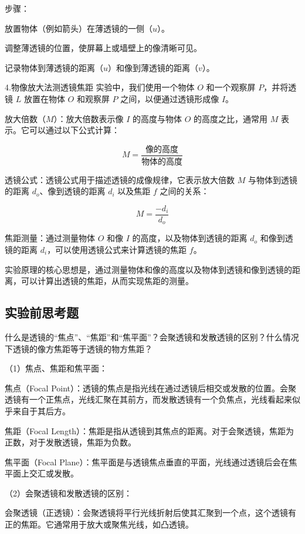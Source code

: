 \documentclass[dvipsnames, svgnames,a4paper,11pt]{article}
\begin{document}
	步骤：
	
	放置物体（例如箭头）在薄透镜的一侧（\(u\)）。
	
	调整薄透镜的位置，使屏幕上或墙壁上的像清晰可见。
	
	记录物体到薄透镜的距离（\(u\)）和像到薄透镜的距离（\(v\)）。
	
	4.物像放大法测透镜焦距
	实验中，我们使用一个物体 \(O\) 和一个观察屏 \(P\)，并将透镜 \(L\) 放置在物体 \(O\) 和观察屏 \(P\) 之间，以便通过透镜形成像 \(I\)。
	
	放大倍数（\(M\)）：放大倍数表示像 \(I\) 的高度与物体 \(O\) 的高度之比，通常用 \(M\) 表示。它可以通过以下公式计算：
	
	\[
	M = \frac{{\text{像的高度}}}{{\text{物体的高度}}}
	\]
	
	透镜公式：透镜公式用于描述透镜的成像规律，它表示放大倍数 \(M\) 与物体到透镜的距离 \(d_o\)、像到透镜的距离 \(d_i\) 以及焦距 \(f\) 之间的关系：
	
	\[
	M = \frac{{-d_i}}{{d_o}}
	\]
	
	焦距测量：通过测量物体 \(O\) 和像 \(I\) 的高度，以及物体到透镜的距离 \(d_o\) 和像到透镜的距离 \(d_i\)，可以使用透镜公式来计算透镜的焦距 \(f\)。
	
	实验原理的核心思想是，通过测量物体和像的高度以及物体到透镜和像到透镜的距离，可以计算出透镜的焦距，从而实现焦距的测量。
	
	\subsection{实验前思考题}
	\begin{question}
		什么是透镜的“焦点”、“焦距”和“焦平面”？会聚透镜和发散透镜的区别？什么情况下透镜的像方焦距等于透镜的物方焦距？
	\end{question}
	（1）焦点、焦距和焦平面：
	
	焦点（Focal Point）：透镜的焦点是指光线在通过透镜后相交或发散的位置。会聚透镜有一个正焦点，光线汇聚在其前方，而发散透镜有一个负焦点，光线看起来似乎来自于其后方。
	
	焦距（Focal Length）：焦距是指从透镜到其焦点的距离。对于会聚透镜，焦距为正数，对于发散透镜，焦距为负数。
	
	焦平面（Focal Plane）：焦平面是与透镜焦点垂直的平面，光线通过透镜后会在焦平面上交汇或发散。
	
	（2）会聚透镜和发散透镜的区别：
	
	会聚透镜（正透镜）：会聚透镜将平行光线折射后使其汇聚到一个点，这个透镜有正的焦距。它通常用于放大或聚焦光线，如凸透镜。
	
\end{document}
